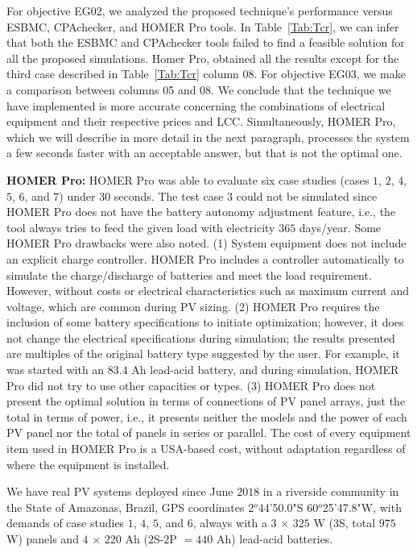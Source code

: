 \documentclass[10pt,journal,compsoc]{IEEEtran}
\begin{document}
For objective EG02, we analyzed the proposed technique's performance versus ESBMC, CPAchecker, and HOMER Pro tools. In Table~\ref{Tab:Tcr}, we can infer that both the ESBMC and CPAchecker tools failed to find a feasible solution for all the proposed simulations. Homer Pro, obtained all the results except for the third case described in Table~\ref{Tab:Tcr} column 08. For objective EG03, we make a comparison between columns 05 and 08. We conclude that the technique we have implemented is more accurate concerning the combinations of electrical equipment and their respective prices and LCC. Simultaneously, HOMER Pro, which we will describe in more detail in the next paragraph, processes the system a few seconds faster with an acceptable answer, but that is not the optimal one.

\textbf{HOMER Pro:} HOMER Pro was able to evaluate six case studies (cases $1$, $2$, $4$, $5$, $6$, and $7$) under $30$ seconds. The test case $3$ could not be simulated since HOMER Pro does not have the battery autonomy adjustment feature, i.e., the tool always tries to feed the given load with electricity $365$ days/year. Some HOMER Pro drawbacks were also noted. (1) System equipment does not include an explicit charge controller. HOMER Pro includes a controller automatically to simulate the charge/discharge of batteries and meet the load requirement. However, without costs or electrical characteristics such as maximum current and voltage, which are common during PV sizing. (2) HOMER Pro requires the inclusion of some battery specifications to initiate optimization; however, it does not change the electrical specifications during simulation; the results presented are multiples of the original battery type suggested by the user. For example, it was started with an $83.4$ Ah lead-acid battery, and during simulation, HOMER Pro did not try to use other capacities or types. (3) HOMER Pro does not present the optimal solution in terms of connections of PV panel arrays, just the total in terms of power, i.e., it presents neither the models and the power of each PV panel nor the total of panels in series or parallel. The cost of every equipment item used in HOMER Pro is a USA-based cost, without adaptation regardless of where the equipment is installed. \color{black}

We have real PV systems deployed since June $2018$ in a riverside community in the State of Amazonas, Brazil, GPS coordinates 2$^{o}$44'50.0"S 60$^{o}$25'47.8"W, with demands of case studies $1$, $4$, $5$, and $6$, always with a $3$ $\times$ $325$ W ($3$S, total $975$ W) panels and $4$ $\times$ $220$ Ah ($2$S-$2$P $= 440$ Ah) lead-acid batteries.
\end{document}
